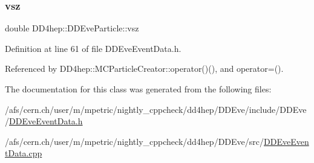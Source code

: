 \subsubsection{\texorpdfstring{vsz}{vsz}}
{\footnotesize\ttfamily double D\+D4hep\+::\+D\+D\+Eve\+Particle\+::vsz}



Definition at line 61 of file D\+D\+Eve\+Event\+Data.\+h.



Referenced by D\+D4hep\+::\+M\+C\+Particle\+Creator\+::operator()(), and operator=().



The documentation for this class was generated from the following files\+:\begin{DoxyCompactItemize}
\item 
/afs/cern.\+ch/user/m/mpetric/nightly\+\_\+cppcheck/dd4hep/\+D\+D\+Eve/include/\+D\+D\+Eve/\hyperlink{_d_d_eve_event_data_8h}{D\+D\+Eve\+Event\+Data.\+h}\item 
/afs/cern.\+ch/user/m/mpetric/nightly\+\_\+cppcheck/dd4hep/\+D\+D\+Eve/src/\hyperlink{_d_d_eve_event_data_8cpp}{D\+D\+Eve\+Event\+Data.\+cpp}\end{DoxyCompactItemize}
